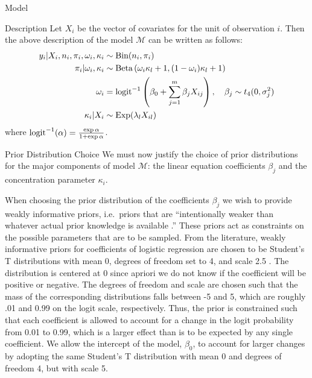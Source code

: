 \begin{chapter}{Model}
\begin{section}{Description}
  Let $X_i$ be the vector of covariates for the unit of observation $i$. Then
  the above description of the model $\mathcal{M}$ can be written as follows:
  \begin{align*}
    y_i | X_i, n_i, \pi_i, \omega_i, \kappa_i &\sim \text{Bin}(n_i, \pi_i) \\
    \pi_i | \omega_i, \kappa_i &\sim \text{Beta}\left(\omega_i \kappa_l + 1, (1 - \omega_i) \kappa_l + 1\right) \\
    \omega_i &= \operatorname{logit}^{-1}\left(\beta_0 + \sum_{j=1}^m  \beta_j X_{ij}\right), \quad \beta_j \sim t_4(0, \sigma_j^2) \\
    \kappa_i | X_i &\sim \text{Exp}(\lambda_l X_{il})
  \end{align*}
  where $\operatorname{logit}^{-1}(\alpha) = \frac{\exp{\alpha}}{1 + \exp{\alpha}}$.
\end{section}

\begin{section}{Prior Distribution Choice}
  We must now justify the choice of prior distributions for the major components of model $\mathcal{M}$:
  the linear equation coefficients $\beta_j$ and the concentration
  parameter $\kappa_i$.

  When choosing the prior distribution of the coefficients $\beta_j$ we wish to provide weakly informative
  priors, i.e.\ priors that are ``intentionally weaker than whatever actual prior knowledge is available \cite{bda3}.''
  These priors act as constraints on the possible parameters that are to be sampled. From the literature,
  weakly informative priors for coefficients of logistic regression are chosen to be Student's T distributions
  with mean 0, degrees of freedom set to 4, and scale 2.5 \cite{bda3}.
  The distribution is centered at 0 since apriori we do not
  know if the coefficient will be positive or negative. The degrees of
  freedom and scale are chosen such that the mass of the corresponding distributions falls between -5 and 5,
  which are roughly .01 and 0.99 on the logit scale, respectively.
  Thus, the prior is constrained such that each coefficient
  is allowed to account for a change in the logit probability from 0.01 to 0.99, which is a larger effect than is to be expected
  by any single coefficient. We allow the intercept of the model, $\beta_0$, to account for larger changes by adopting the same Student's T distribution
  with mean 0 and degrees of freedom 4, but with scale 5.


\end{section}
\end{chapter}
